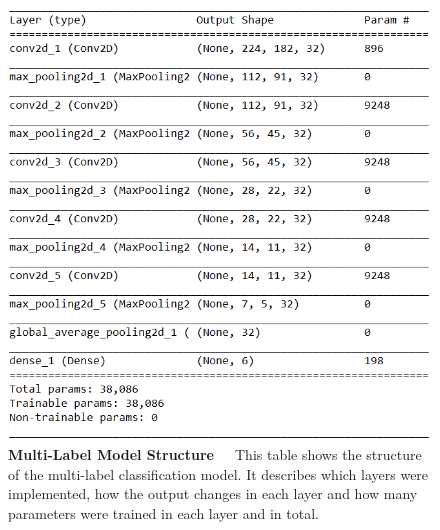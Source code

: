 \\
\begin{figure}[h]
	\centering
	\includegraphics[scale=0.8]{Figures/chapter04/multilabel_structure}
	\decoRule
	\caption[Multi-Label Model Structure]{\textbf{Multi-Label Model Structure}~~~This table shows the structure of the multi-label classification model. It describes which layers were implemented, how the output changes in each layer and how many parameters were trained in each layer and in total.}
	\label{fig:MultilabelStructure}
\end{figure}

